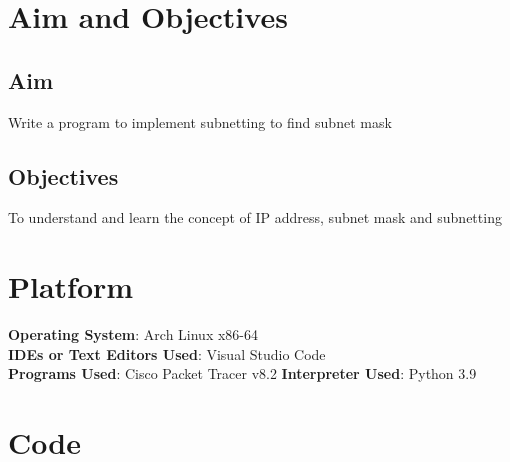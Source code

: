\documentclass[11pt]{article}
\begin{document}
\tableofcontents
\thispagestyle{empty}
\clearpage


\setcounter{page}{1}

\section{Aim and Objectives}
\subsection*{Aim}
Write a  program to implement subnetting to find subnet mask

\subsection*{Objectives}
To understand and learn the concept of IP address, subnet mask and subnetting

\section{Platform}
\textbf{Operating System}: Arch Linux x86-64\\
\textbf{IDEs or Text Editors Used}: Visual Studio Code\\
\textbf{Programs Used}: Cisco Packet Tracer v8.2
\textbf{Interpreter Used}: Python 3.9

\section{Code}


\end{document}
